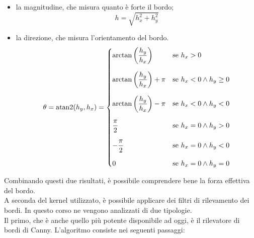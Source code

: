 \begin{itemize}
    \item la magnitudine, che misura quanto è forte il bordo;
    \begin{equation*}
        h=\sqrt{h_x^2+h_y^2}
    \end{equation*}
    \item la direzione, che misura l'orientamento del bordo.
    \begin{equation*}
        \theta =  \operatorname{atan2}(h_y, h_x)=
        \begin{dcases}
               \arctan\left(\frac{h_y}{h_x}\right) & \text{se } h_x > 0 \\[1.5ex]
                \arctan\left(\frac{h_y}{h_x}\right)+\pi & \text{se } h_x < 0 \land h_y \ge 0 \\[1.5ex]
                \arctan\left(\frac{h_y}{h_x}\right)-\pi & \text{se } h_x < 0 \land h_y < 0 \\[1.5ex]
                \frac{\pi}{2} & \text{se } h_x = 0 \land h_y > 0 \\[1.5ex]
                -\frac{\pi}{2} & \text{se } h_x = 0 \land h_y < 0 \\[1.5ex]    0 & \text{se } h_x = 0 \land h_y = 0 
            \end{dcases}
    \end{equation*}
\end{itemize}
Combinando questi due risultati, è possibile comprendere bene la forza effettiva del bordo.\\
A seconda del kernel utilizzato, è possibile applicare dei filtri di rilevamento dei bordi. In questo corso ne vengono analizzati di due tipologie.\\
Il primo, che è anche quello più potente disponibile ad oggi, è il rilevatore di bordi di Canny. L'algoritmo consiste nei seguenti passaggi:\\
